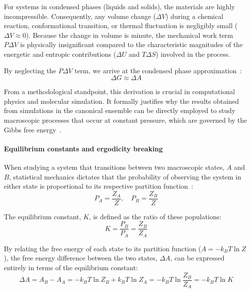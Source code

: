 For systems in condensed phases (liquids and solids), the materials are highly incompressible. Consequently, any volume change ($\Delta V$) during a chemical reaction, conformational transition, or thermal fluctuation is negligibly small ($\Delta V \approx 0$). Because the change in volume is minute, the mechanical work term $P\Delta V$ is physically insignificant compared to the characteristic magnitudes of the energetic and entropic contributions ($\Delta U$ and $T\Delta S$) involved in the process.

By neglecting the $P\Delta V$ term, we arrive at the condensed phase approximation~\cite{termo_1,termo_2}:
\begin{equation}
    \Delta G \approx \Delta A
\end{equation}

From a methodological standpoint, this derivation is crucial in computational physics and molecular simulation. It formally justifies why the results obtained from simulations in the canonical ensemble can be directly employed to study macroscopic processes that occur at constant pressure, which are governed by the Gibbs free energy~\cite{termo_1,termo_2}.

\paragraph{Equilibrium constants and ergodicity breaking}

When studying a system that transitions between two macroscopic states, $A$ and $B$, statistical mechanics dictates that the probability of observing the system in either state is proportional to its respective partition function~\cite{termo_1,termo_2}:
\begin{equation}
    P_A = \frac{Z_A}{Z}, \quad P_B = \frac{Z_B}{Z}
\end{equation}

The equilibrium constant, $K$, is defined as the ratio of these populations:
\begin{equation}
    K = \frac{P_B}{P_A} = \frac{Z_B}{Z_A}
\end{equation}

By relating the free energy of each state to its partition function ($A = -k_B T \ln Z$), the free energy difference between the two states, $\Delta A$, can be expressed entirely in terms of the equilibrium constant:
\begin{equation}
    \Delta A = A_B - A_A = -k_B T \ln Z_B + k_B T \ln Z_A = -k_B T \ln \frac{Z_B}{Z_A} = -k_B T \ln K
\end{equation}

